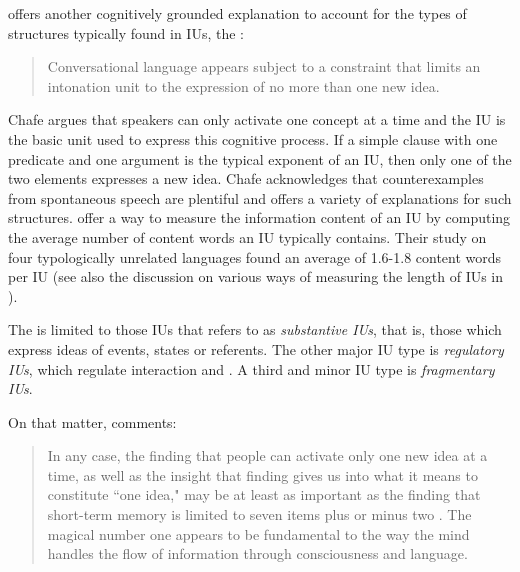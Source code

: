 \citet[108]{chafe1994discourse} offers another cognitively grounded explanation to account for the types of structures typically found in IUs,  the  \textit{}:

\begin{quotation}
	Conversational language appears subject to a constraint that limits an intonation unit to the expression of no more than one new idea. 
\end{quotation}

Chafe argues that speakers can only activate one concept at a time and the IU is the basic unit used to express this cognitive process. If a simple clause with one predicate and one argument is the typical exponent of an IU, then only one of the two elements expresses a new idea. Chafe acknowledges that counterexamples from spontaneous speech are plentiful and offers a variety of explanations for such structures.  
\citet{himmelmann_IP_Universal} offer a way to measure the information content of an IU by computing the average number of content words an IU typically contains. Their study on four typologically unrelated languages found an average of 1.6-1.8 content words per IU (see also the discussion on various ways of measuring the length of IUs in ). 


The \textit{} is limited to those IUs that   \citet[63]{chafe1994discourse} refers to  as \textit{substantive IUs},  that is, those which express ideas of events, states or referents. 
The other major IU type is \textit{regulatory IUs},  which regulate interaction and . A third and minor IU type is \textit{fragmentary IUs}. 


On that matter, \citet[119]{chafe1994discourse} comments:


\begin{quotation}
	In any case, the finding that people can activate only one new idea at a  time, as well as the insight that finding gives us into what it means to constitute ``one idea," may be at least as important as the finding that short-term memory is limited to seven items plus or minus two \citep{Miller_1994}. The magical number one appears to be fundamental to the way the mind handles the flow of information through consciousness and language. 
\end{quotation}

